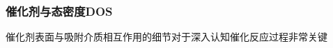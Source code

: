 \frame
{
	\frametitle{催化剂与态密度\textrm{DOS}}
	催化剂表面与吸附介质相互作用的细节对于深入认知催化反应过程非常关键%
	\vskip 5pt
	{\fontsize{6.2pt}{5.2pt}\selectfont{研究中通过态密度来表征催化表面的电子结构的改变}}


}
